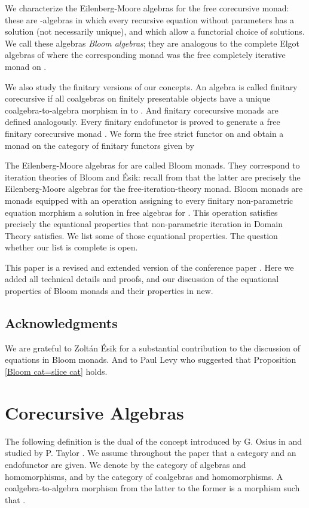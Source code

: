 \documentclass{LMCS}
\theoremstyle{plain}
\theoremstyle{definition}
\numberwithin{equation}{section}
\begin{document}
We characterize the Eilenberg-Moore algebras for the free corecursive monad:  these are -algebras in which  every recursive equation without parameters has a solution (not necessarily unique), and which allow a functorial choice of solutions. We call these algebras \emph{Bloom algebras}; they are analogous to the complete Elgot algebras of \cite{amv3} where the corresponding monad was the free completely iterative monad on .

We also study the finitary versions of our concepts. An algebra  is
called finitary corecursive if all coalgebras on finitely presentable
objects have a unique coalgebra-to-algebra morphism in to . And
finitary corecursive monads are defined analogously. Every finitary
endofunctor  is proved to generate a free finitary corecursive
monad . We form the free strict functor  on
 and obtain a monad  on the category of finitary
functors given by
 
The Eilenberg-Moore algebras for  are called Bloom
monads. They correspond to iteration theories of Bloom and \'Esik:
recall from \cite{amv_what} that the latter are precisely the
Eilenberg-Moore algebras for the free-iteration-theory monad. Bloom
monads are monads  equipped with an operation 
assigning to every finitary non-parametric equation morphism a
solution in free algebras for . This operation satisfies
precisely the equational properties that non-parametric iteration in
Domain Theory satisfies. We list some of those equational
properties. The question whether our list is complete is open.

This paper is a revised and extended version of the conference paper
\cite{ahm11}. Here we added all technical details and proofs, and our
discussion of the equational properties of Bloom monads and their
properties in new.

\subsection*{Acknowledgments}
We are grateful to Zolt\'an \'Esik for a substantial contribution to the discussion of equations in Bloom monads. And to Paul Levy who suggested that  Proposition \ref{Bloom cat=slice cat} holds.






\section{Corecursive Algebras}
The following definition is the dual of the concept introduced by G. Osius in \cite{g} and studied by P. Taylor \cite{t,t2}. We assume throughout the paper that  a category  and an endofunctor  are given. We denote by  the category of algebras  and homomorphisms, and by  the category of coalgebras  and homomorphisms. A coalgebra-to-algebra morphism from the latter to the former  is a morphism  such that .
\end{document}
